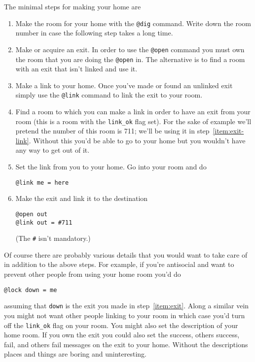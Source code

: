 The minimal steps for making your home are
\begin{enumerate}
\item
Make the room for your home with the {\tt @dig} command.  Write down
the room number in case the following step takes a long time.

\item
\label{item:exit}
Make or acquire an exit.  In order to use the {\tt @open} command you
must own the room that you are doing the {\tt @open} in.  The
alternative is to find a room with an exit that isn't linked and use
it.

\item
Make a link to your home.  Once you've made or found an unlinked exit
simply use the {\tt @link} command to link the exit to your room.

\item
\label{item:exit-room}
Find a room to which you can make a link in order to have an exit from
your room (this is a room with the \verb|link_ok| flag set).  For the
sake of example we'll pretend the number of this room is 711; we'll be
using it in step~\ref{item:exit-link}.  Without this you'd be able to
go to your home but you wouldn't have any way to get out of it.

\item
Set the link from you to your home.  Go into your room and do
\begin{verbatim}
@link me = here
\end{verbatim}

\item
\label{item:exit-link}
Make the exit and link it to the destination
\begin{verbatim}
@open out
@link out = #711
\end{verbatim}
(The \verb|#| isn't mandatory.)
\end{enumerate}

Of course there are probably various details that you would want to
take care of in addition to the above steps.  For example, if you're
antisocial and want to prevent other people from using your home room
you'd do
\begin{verbatim}
@lock down = me
\end{verbatim}
assuming that {\tt down} is the exit you made in step~\ref{item:exit}.
Along a similar vein you might not want other people linking to your
room in which case you'd turn off the \verb|link_ok| flag on your
room.  You might also set the description of your home room.  If you
own the exit you could also set the success, others success, fail, and
others fail messages on the exit to your home.  Without the
descriptions places and things are boring and uninteresting.


